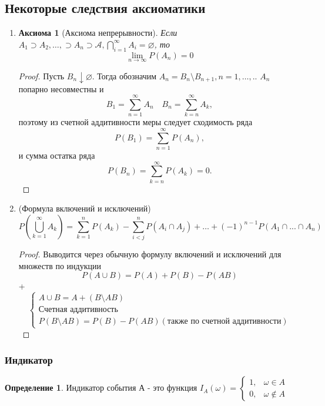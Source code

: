 \documentclass[a4paper]{article}
\newtheorem*{axiom}{Аксиома}
\theoremstyle{definition}
\newtheorem*{definition}{Определение}
\theoremstyle{remark}
\begin{document}
\subsection{Некоторые следствия аксиоматики}
\begin{enumerate}
    \item \begin{axiom}[Аксиома непрерывности]
        Если $A_1\supset A_2, \dots, \supset A_n \supset \mathcal{A}, \bigcap\limits_{i = 1}^\infty A_i = \varnothing$, то
        \[\lim\limits_{n\to \infty} P(A_n) = 0\]
    \end{axiom}
    \begin{proof}
        Пусть $B_n\downarrow \varnothing$. Тогда обозначим $A_n = B_n \setminus B_{n+1}, n = 1, \dots, .$. $A_n$ попарно несовместны и 
        \[B_1  =    \sum\limits_{n = 1}^\infty A_n \quad B_n  =  \sum\limits_{k = n}^\infty A_k, \]
        поэтому из счетной аддитивности меры следует сходимость ряда \[P(B_1)=\sum\limits_{n = 1}^\infty P(A_n),\] и сумма остатка ряда \[P(B_n) =  \sum\limits_{k = n}^\infty P(A_k) = 0.\] 
    \end{proof}
    \item (Формула включений и исключений)
    \[P(\bigcup\limits_{k = 1}^\infty A_k)  = \sum_{k = 1}^n P(A_k) - \sum_{i < j}^n P(A_i \cap A_j) + \dots + {(-1)}^{n-1} P(A_1 \cap ... \cap A_n)\]
    \begin{proof}
        Выводится через обычную формулу включений и исключений для множеств по индукции \[P(A \cup B) = P(A) + P(B) - P(AB)\]+ 
        \[\begin{cases}
            A \cup B = A + (B\setminus AB) \\ 
            \text{Счетная аддитивность} \\ 
            P(B \setminus AB) = P(B) - P(AB) (\text{также по счетной аддитивности})
        \end{cases}
        \]
    \end{proof}
\end{enumerate}
\subsubsection{Индикатор}
\begin{definition}
    Индикатор события А - это функция $I_A(\omega) = \begin{cases}
        1,  & \omega \in A \\
        0,  & \omega \notin A
        \end{cases}$
\end{definition}
\end{document}
